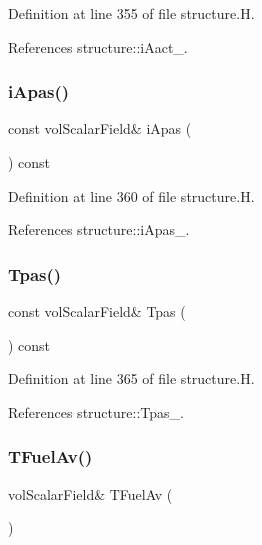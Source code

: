 Definition at line 355 of file structure.\+H.



References structure\+::i\+Aact\+\_\+.

\mbox{\label{classFoam_1_1structure_acba35586ab8aff24636d1147ec8878a9}} 
\subsubsection{\texorpdfstring{i\+Apas()}{iApas()}}
{\footnotesize\ttfamily const vol\+Scalar\+Field\& i\+Apas (\begin{DoxyParamCaption}{ }\end{DoxyParamCaption}) const\hspace{0.3cm}{\ttfamily [inline]}}



Definition at line 360 of file structure.\+H.



References structure\+::i\+Apas\+\_\+.

\mbox{\label{classFoam_1_1structure_aee77d3c69364c93087597bb03ca5093b}} 
\subsubsection{\texorpdfstring{Tpas()}{Tpas()}}
{\footnotesize\ttfamily const vol\+Scalar\+Field\& Tpas (\begin{DoxyParamCaption}{ }\end{DoxyParamCaption}) const\hspace{0.3cm}{\ttfamily [inline]}}



Definition at line 365 of file structure.\+H.



References structure\+::\+Tpas\+\_\+.

\mbox{\label{classFoam_1_1structure_a814968a5ac76932267a7dfbb719addb1}} 
\subsubsection{\texorpdfstring{T\+Fuel\+Av()}{TFuelAv()}}
{\footnotesize\ttfamily vol\+Scalar\+Field\& T\+Fuel\+Av (\begin{DoxyParamCaption}{ }\end{DoxyParamCaption})\hspace{0.3cm}{\ttfamily [inline]}}



